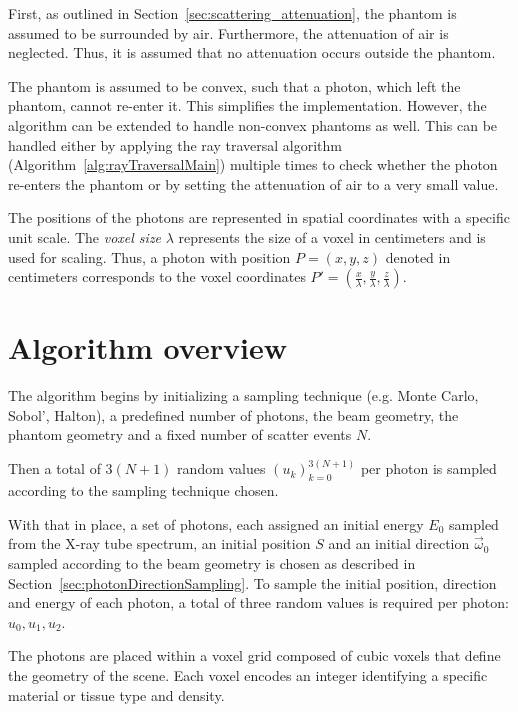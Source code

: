 First, as outlined in Section~\ref{sec:scattering_attenuation}, the phantom is assumed to be surrounded by air. Furthermore, the
attenuation of air is neglected. Thus, it is assumed that no attenuation occurs outside the phantom.

The phantom is assumed to be convex, such that a photon, which left the phantom,
cannot re-enter it. This simplifies the implementation. However, the algorithm
can be extended to handle non-convex phantoms as well. This can be handled either by applying the
ray traversal algorithm (Algorithm~\ref{alg:rayTraversalMain}) multiple times to check whether the photon re-enters the
phantom or by setting the attenuation of air to a very small value.

The positions of the photons are represented in spatial coordinates with a
specific unit scale. The \emph{voxel size} $\lambda$ represents the size of a
voxel in centimeters and is used for scaling. Thus, a photon with position
$P=(x,y,z)$ denoted in centimeters corresponds to the voxel coordinates
$P'=(\frac{x}{\lambda}, \frac{y}{\lambda}, \frac{z}{\lambda})$.

\section{Algorithm overview}
\label{sec:algorithmOverview}

The algorithm begins by initializing a sampling technique (e.g. Monte
Carlo, Sobol', Halton), a predefined number of photons, the beam geometry, the
phantom geometry and a fixed number of scatter events $N$.

Then a total of $3(N+1)$ random values $(u_k)_{k=0}^{3(N+1)}$ per photon is
sampled according to the sampling technique chosen.

With that in place, a set of photons, each assigned an initial energy $E_0$
sampled from the X-ray tube spectrum, an initial position $S$ and an initial
direction $\vec{\omega}_0$ sampled according to the beam geometry is chosen as
described in Section~\ref{sec:photonDirectionSampling}. To sample the initial
position, direction and energy of each photon, a total of three random values is
required per photon: $u_0, u_1, u_2$.

The photons are placed within a voxel grid composed of cubic voxels that define
the geometry of the scene. Each voxel encodes an integer identifying a
specific material or tissue type and density. 

